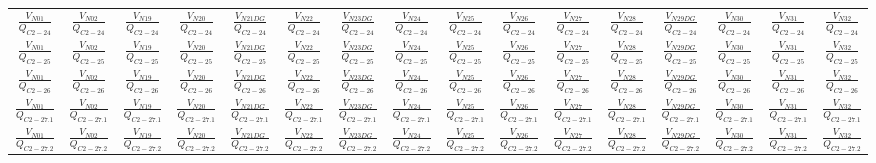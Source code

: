\begin{table}[H]
{\begin{tabular}{cccccccccccccccc}
			$\frac{V_{N01}}{Q_{C 2-24}}$& $\frac{V_{N02}}{Q_{C 2-24}}$& $\frac{V_{N19}}{Q_{C 2-24}}$& $\frac{V_{N20}}{Q_{C 2-24}}$& $\frac{V_{N21 DG}}{Q_{C 2-24}}$& $\frac{V_{N22}}{Q_{C 2-24}}$& $\frac{V_{N23 DG}}{Q_{C 2-24}}$& $\frac{V_{N24}}{Q_{C 2-24}}$& $\frac{V_{N25}}{Q_{C 2-24}}$& $\frac{V_{N26}}{Q_{C 2-24}}$&$\frac{V_{N27}}{Q_{C 2-24}}$&$\frac{V_{N28}}{Q_{C 2-24}}$&$\frac{V_{N29 DG}}{Q_{C 2-24}}$&$\frac{V_{N30}}{Q_{C 2-24}}$&$\frac{V_{N31}}{Q_{C 2-24}}$&$\frac{V_{N32}}{Q_{C 2-24}}$\\
			
			$\frac{V_{N01}}{Q_{C 2-25}}$& $\frac{V_{N02}}{Q_{C 2-25}}$& $\frac{V_{N19}}{Q_{C 2-25}}$& $\frac{V_{N20}}{Q_{C 2-25}}$& $\frac{V_{N21 DG}}{Q_{C 2-25}}$& $\frac{V_{N22}}{Q_{C 2-25}}$& $\frac{V_{N23 DG}}{Q_{C 2-25}}$& $\frac{V_{N24}}{Q_{C 2-25}}$& $\frac{V_{N25}}{Q_{C 2-25}}$& $\frac{V_{N26}}{Q_{C 2-25}}$&$\frac{V_{N27}}{Q_{C 2-25}}$&$\frac{V_{N28}}{Q_{C 2-25}}$&$\frac{V_{N29 DG}}{Q_{C 2-25}}$&$\frac{V_{N30}}{Q_{C 2-25}}$&$\frac{V_{N31}}{Q_{C 2-25}}$&$\frac{V_{N32}}{Q_{C 2-25}}$\\
			
			$\frac{V_{N01}}{Q_{C 2-26}}$& $\frac{V_{N02}}{Q_{C 2-26}}$& $\frac{V_{N19}}{Q_{C 2-26}}$& $\frac{V_{N20}}{Q_{C 2-26}}$& $\frac{V_{N21 DG}}{Q_{C 2-26}}$& $\frac{V_{N22}}{Q_{C 2-26}}$& $\frac{V_{N23 DG}}{Q_{C 2-26}}$& $\frac{V_{N24}}{Q_{C 2-26}}$& $\frac{V_{N25}}{Q_{C 2-26}}$& $\frac{V_{N26}}{Q_{C 2-26}}$&$\frac{V_{N27}}{Q_{C 2-26}}$&$\frac{V_{N28}}{Q_{C 2-26}}$&$\frac{V_{N29 DG}}{Q_{C 2-26}}$&$\frac{V_{N30}}{Q_{C 2-26}}$&$\frac{V_{N31}}{Q_{C 2-26}}$&$\frac{V_{N32}}{Q_{C 2-26}}$\\
			
			$\frac{V_{N01}}{Q_{C 2-27.1}}$& $\frac{V_{N02}}{Q_{C 2-27.1}}$& $\frac{V_{N19}}{Q_{C 2-27.1}}$& $\frac{V_{N20}}{Q_{C 2-27.1}}$& $\frac{V_{N21 DG}}{Q_{C 2-27.1}}$& $\frac{V_{N22}}{Q_{C 2-27.1}}$& $\frac{V_{N23 DG}}{Q_{C 2-27.1}}$& $\frac{V_{N24}}{Q_{C 2-27.1}}$& $\frac{V_{N25}}{Q_{C 2-27.1}}$& $\frac{V_{N26}}{Q_{C 2-27.1}}$&$\frac{V_{N27}}{Q_{C 2-27.1}}$&$\frac{V_{N28}}{Q_{C 2-27.1}}$&$\frac{V_{N29 DG}}{Q_{C 2-27.1}}$&$\frac{V_{N30}}{Q_{C 2-27.1}}$&$\frac{V_{N31}}{Q_{C 2-27.1}}$&$\frac{V_{N32}}{Q_{C 2-27.1}}$\\
			
			$\frac{V_{N01}}{Q_{C 2-27.2}}$& $\frac{V_{N02}}{Q_{C 2-27.2}}$& $\frac{V_{N19}}{Q_{C 2-27.2}}$& $\frac{V_{N20}}{Q_{C 2-27.2}}$& $\frac{V_{N21 DG}}{Q_{C 2-27.2}}$& $\frac{V_{N22}}{Q_{C 2-27.2}}$& $\frac{V_{N23 DG}}{Q_{C 2-27.2}}$& $\frac{V_{N24}}{Q_{C 2-27.2}}$& $\frac{V_{N25}}{Q_{C 2-27.2}}$& $\frac{V_{N26}}{Q_{C 2-27.2}}$&$\frac{V_{N27}}{Q_{C 2-27.2}}$&$\frac{V_{N28}}{Q_{C 2-27.2}}$&$\frac{V_{N29 DG}}{Q_{C 2-27.2}}$&$\frac{V_{N30}}{Q_{C 2-27.2}}$&$\frac{V_{N31}}{Q_{C 2-27.2}}$&$\frac{V_{N32}}{Q_{C 2-27.2}}$\\
			

\end{tabular}}
\end{table}
